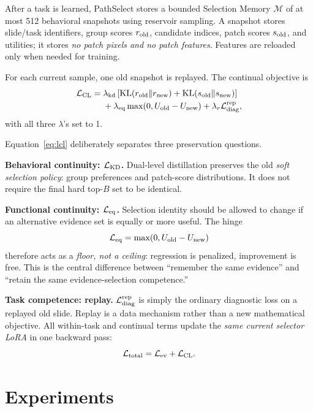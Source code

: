 \documentclass{article}
\def\L{{\cal L}}
\newcommand{\Mem}{\mathcal{M}}
\begin{document}
After a task is learned, PathSelect stores a bounded Selection Memory
$\Mem$ of at most 512 behavioral snapshots using reservoir sampling.
A snapshot stores slide/task identifiers, group scores $r_{\rm old}$, candidate indices, patch scores $s_{\rm old}$, and utilities; it stores \emph{no patch pixels and no patch features}.
Features are reloaded only when needed for training.

For each current sample, one old snapshot is replayed.
The continual objective is
\begin{align}
\L_{\mathrm{CL}}
={}&
\lambda_{\mathrm{kd}}
\left[
\mathrm{KL}(r_{\mathrm{old}}\Vert r_{\mathrm{new}})
+
\mathrm{KL}(s_{\mathrm{old}}\Vert s_{\mathrm{new}})
\right]
\nonumber\\
&+
\lambda_{\mathrm{eq}}
\max(0,U_{\mathrm{old}}-U_{\mathrm{new}})
+
\lambda_r \L_{\mathrm{diag}}^{\mathrm{rep}},
\label{eq:lcl}
\end{align}
with all three $\lambda$'s set to 1.

Equation~\ref{eq:lcl} deliberately separates three preservation questions.

\textbf{Behavioral continuity: $\L_{\rm KD}$.}
Dual-level distillation preserves the old \emph{soft selection policy}: group preferences and patch-score distributions.
It does not require the final hard top-$B$ set to be identical.

\textbf{Functional continuity: $\L_{\rm eq}$.}
Selection identity should be allowed to change if an alternative evidence set is equally or more useful.
The hinge
\[
\L_{\rm eq}=\max(0,U_{\rm old}-U_{\rm new})
\]
therefore acts as a \emph{floor, not a ceiling}: regression is penalized, improvement is free.
This is the central difference between ``remember the same evidence'' and ``retain the same evidence-selection competence.''

\textbf{Task competence: replay.}
$\L_{\mathrm{diag}}^{\mathrm{rep}}$ is simply the ordinary diagnostic loss on a replayed old slide.
Replay is a data mechanism rather than a new mathematical objective.
All within-task and continual terms update the \emph{same current selector LoRA} in one backward pass:
\[
\L_{\mathrm{total}}=\L_{\mathrm{ev}}+\L_{\mathrm{CL}}.
\]

\section{Experiments}
\label{sec:exp}
\end{document}
